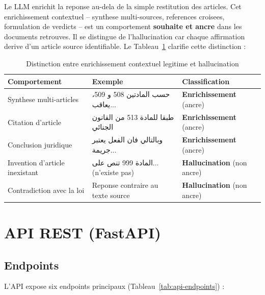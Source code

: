 Le LLM enrichit la reponse au-dela de la simple restitution des articles. Cet enrichissement contextuel -- synthese multi-sources, references croisees, formulation de verdicts -- est un comportement \textbf{souhaite et ancre} dans les documents retrouves. Il se distingue de l'hallucination car chaque affirmation derive d'un article source identifiable. Le Tableau~\ref{tab:enrichment-vs-hallucination} clarifie cette distinction :

\begin{table}[h]
\centering
\renewcommand{\arraystretch}{1.3}
\begin{tabular}{|p{4cm}|p{4cm}|p{4cm}|}
\hline
\rowcolor{LightBlue}
\textbf{\color{PrimaryBlue}Comportement} & \textbf{\color{PrimaryBlue}Exemple} & \textbf{\color{PrimaryBlue}Classification} \\
\hline
Synthese multi-articles & \textarabic{حسب المادتين 508 و 509، يعاقب...} & \textbf{Enrichissement} (ancre) \\
Citation d'article & \textarabic{طبقا للمادة 513 من القانون الجنائي} & \textbf{Enrichissement} (ancre) \\
Conclusion juridique & \textarabic{وبالتالي فان الفعل يعتبر جريمة...} & \textbf{Enrichissement} (ancre) \\
Invention d'article inexistant & \textarabic{المادة 999 تنص على...} (n'existe pas) & \textbf{Hallucination} (non ancre) \\
Contradiction avec la loi & Reponse contraire au texte source & \textbf{Hallucination} (non ancre) \\
\hline
\end{tabular}
\caption{Distinction entre enrichissement contextuel legitime et hallucination}
\label{tab:enrichment-vs-hallucination}
\end{table}

\section{API REST (FastAPI)}

\subsection{Endpoints}

L'API expose six endpoints principaux (Tableau~\ref{tab:api-endpoints}) :

